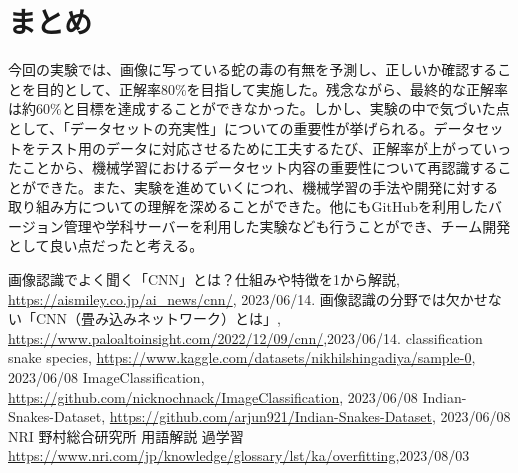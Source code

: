 \documentclass[a4paper, 11pt, titlepage]{jsarticle}
\begin{document}
\section{まとめ}
今回の実験では、画像に写っている蛇の毒の有無を予測し、正しいか確認することを目的として、正解率80\%を目指して実施した。残念ながら、最終的な正解率は約60\%と目標を達成することができなかった。しかし、実験の中で気づいた点として、「データセットの充実性」についての重要性が挙げられる。データセットをテスト用のデータに対応させるために工夫するたび、正解率が上がっていったことから、機械学習におけるデータセット内容の重要性について再認識することができた。また、実験を進めていくにつれ、機械学習の手法や開発に対する取り組み方についての理解を深めることができた。他にもGitHubを利用したバージョン管理や学科サーバーを利用した実験なども行うことができ、チーム開発として良い点だったと考える。

\begin{thebibliography}{n}
	画像認識でよく聞く「CNN」とは？仕組みや特徴を1から解説, \url{https://aismiley.co.jp/ai_news/cnn/}, 2023/06/14.
	画像認識の分野では欠かせない「CNN（畳み込みネットワーク）とは」, \url{https://www.paloaltoinsight.com/2022/12/09/cnn/},2023/06/14.
	classification snake species, \url{https://www.kaggle.com/datasets/nikhilshingadiya/sample-0}, 2023/06/08
	ImageClassification, \url{https://github.com/nicknochnack/ImageClassification}, 2023/06/08
	Indian-Snakes-Dataset, \url{https://github.com/arjun921/Indian-Snakes-Dataset}, 2023/06/08
	NRI 野村総合研究所 用語解説 過学習\url{https://www.nri.com/jp/knowledge/glossary/lst/ka/overfitting},2023/08/03
\end{thebibliography}
\end{document}
